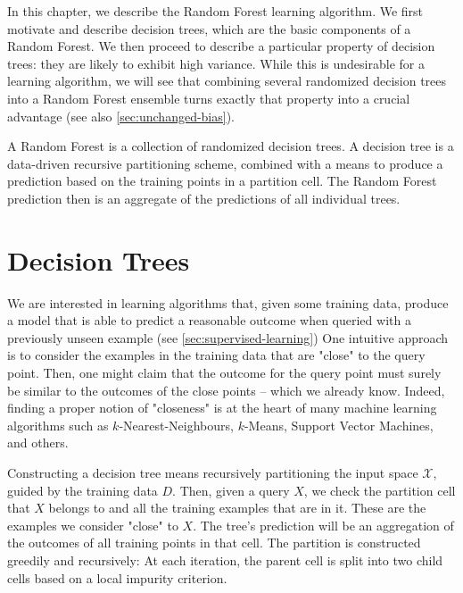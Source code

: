 \documentclass[../main.tex]{subfiles}
\begin{document}
In this chapter, we describe the Random Forest learning algorithm. We first motivate and describe decision trees, which are the basic components of a Random Forest. We then proceed to describe a particular property of decision trees: they are likely to exhibit high variance. While this is undesirable for a learning algorithm, we will see that combining several randomized decision trees into a Random Forest ensemble turns exactly that property into a crucial advantage (see also \cref{sec:unchanged-bias}).

A Random Forest is a collection of randomized decision trees. A decision tree is a data-driven recursive partitioning scheme, combined with a means to produce a prediction based on the training points in a partition cell. The Random Forest prediction then is an aggregate of the predictions of all individual trees.

\section{Decision Trees}
\label{sec:decision-trees}

We are interested in learning algorithms that, given some training data, produce a model that is able to predict a reasonable outcome when queried with a previously unseen example (see \cref{sec:supervised-learning})
One intuitive approach is to consider the examples in the training data that are "close" to the query point. Then, one might claim that the outcome for the query point must surely be similar to the outcomes of the close points -- which we already know. Indeed, finding a proper notion of "closeness" is at the heart of many machine learning algorithms such as $k$-Nearest-Neighbours, $k$-Means, Support Vector Machines, and others.

Constructing a decision tree means recursively partitioning the input space $\mathcal{X}$, guided by the training data $D$. Then, given a query $X$, we check the partition cell that $X$ belongs to
 and all the training examples that are in it. These are the examples we consider "close" to $X$. The tree's prediction will be an aggregation of the outcomes of all training points in that cell. The partition is constructed greedily and recursively: At each iteration, the parent cell is split into two child cells based on a local impurity criterion.
\end{document}
